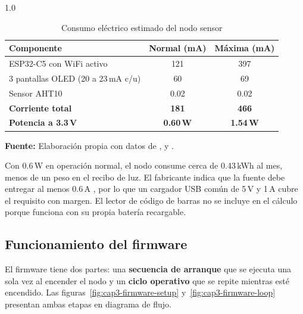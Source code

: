 \begin{table}[H]
\centering
\caption{Consumo eléctrico estimado del nodo sensor}
\label{tab:cap3-consumo}
\begin{spacing}{1.0}
\renewcommand{\arraystretch}{1.2}
\begin{tabularx}{0.8\textwidth}{@{}>{\raggedright}X c c@{}}
\toprule
\textbf{Componente} & \textbf{Normal (mA)} & \textbf{Máxima (mA)} \\
\midrule
ESP32-C5 con WiFi activo & 121 & 397 \\
3 pantallas OLED (20 a 23\,mA c/u) & 60 & 69 \\
Sensor AHT10 & 0.02 & 0.02 \\
\midrule
\textbf{Corriente total} & \textbf{181} & \textbf{466} \\
\textbf{Potencia a 3.3\,V} & \textbf{0.60\,W} & \textbf{1.54\,W} \\
\bottomrule
\end{tabularx}
\end{spacing}
\vspace{0.2cm}
{\footnotesize \textbf{Fuente:} Elaboración propia con datos de \cite{esp32c5-wroom-ds}, \cite{dfrobot-oled} y \cite{aht10-datasheet}.}
\end{table}

Con 0.6\,W en operación normal, el nodo consume cerca de 0.43\,kWh al mes, menos de un peso en el recibo de luz. El fabricante indica que la fuente debe entregar al menos 0.6\,A \cite{esp32c5-wroom-ds}, por lo que un cargador USB común de 5\,V y 1\,A cubre el requisito con margen. El lector de código de barras no se incluye en el cálculo porque funciona con su propia batería recargable.


\subsection{Funcionamiento del firmware}

El firmware tiene dos partes: una \textbf{secuencia de arranque} que se ejecuta una sola vez al encender el nodo y un \textbf{ciclo operativo} que se repite mientras esté encendido. Las figuras~\ref{fig:cap3-firmware-setup} y~\ref{fig:cap3-firmware-loop} presentan ambas etapas en diagrama de flujo.

